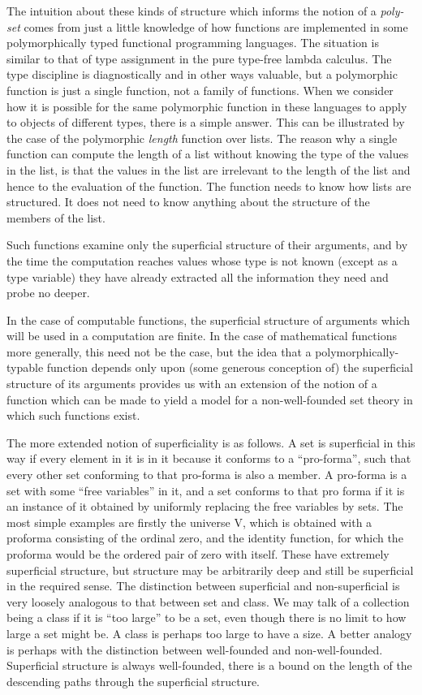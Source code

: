 \documentclass[numreferences]{rbjk}
\begin{document}
\begin{article}
The intuition about these kinds of structure which informs the notion of a \emph{poly-set} comes from just a little knowledge of how functions are implemented in some polymorphically typed functional programming languages.
The situation is similar to that of type assignment in the pure type-free lambda calculus.
The type discipline is diagnostically and in other ways valuable, but a polymorphic function is just a single function, not a family of functions.
When we consider how it is possible for the same polymorphic function in these languages to apply to objects of different types, there is a simple answer.
This can be illustrated by the case of the polymorphic \emph{length} function over lists.
The reason why a single function can compute the length of a list without knowing the type of the values in the list, is that the values in the list are irrelevant to the length of the list and hence to the evaluation of the function.
The function needs to know how lists are structured.
It does not need to know anything about the structure of the members of the list.

Such functions examine only the superficial structure of their arguments, and by the time the computation reaches values whose type is not known (except as a type variable) they have already extracted all the information they need and probe no deeper.

In the case of computable functions, the superficial structure of arguments which will be used in a computation are finite.
In the case of mathematical functions more generally, this need not be the case, but the idea that a polymorphically-typable function depends only upon (some generous conception of) the superficial structure of its arguments provides us with an extension of the notion of a function which can be made to yield a model for a non-well-founded set theory in which such functions exist.

The more extended notion of superficiality is as follows.
A set is superficial in this way if every element in it is in it because it conforms to a ``pro-forma'', such that every other set conforming to that pro-forma is also a member.
A pro-forma is a set with some ``free variables'' in it, and a set conforms to that pro forma if it is an instance of it obtained by uniformly replacing the free variables by sets.
The most simple examples are firstly the universe V, which is obtained with a proforma consisting of the ordinal zero, and the identity function, for which the proforma would be the ordered pair of zero with itself.
These have extremely superficial structure, but structure may be arbitrarily deep and still be superficial in the required sense.
The distinction between superficial and non-superficial is very loosely analogous to that between set and class.
We may talk of a collection being a class if it is ``too large'' to be a set, even though there is no limit to how large a set might be.
A class is perhaps too large to have a size.
A better analogy is perhaps with the distinction between well-founded and non-well-founded.
Superficial structure is always well-founded, there is a bound on the length of the descending paths through the superficial structure.


\end{article}
\end{document}

